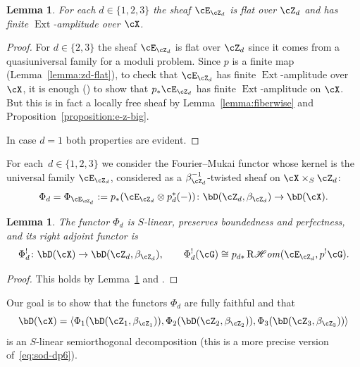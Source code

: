 \documentclass[11pt]{amsart}
\DeclareMathOperator{\Ext}{\mathrm{Ext}}
\DeclareMathOperator{\RCHom}{\mathrm{R}\mathscr{H}\mathit{om}}
\theoremstyle{plain}
\newtheorem{lemma}[theorem]{Lemma}
\theoremstyle{definition}
\theoremstyle{remark}
\begin{document}
\begin{lemma}
\label{lemma:ezd-tor-ext}
For each $d \in \{1,2,3\}$ the sheaf $\cE_{\cZ_d}$ is flat over $\cZ_d$ and has finite $\Ext$-amplitude over $\cX$.
\end{lemma}
\begin{proof}
For $d \in \{2,3\}$ the sheaf $\cE_{\cZ_d}$ is flat over $\cZ_d$ since it comes from a quasiuniversal family for a moduli problem.
Since $p$ is a finite map (Lemma~\ref{lemma:zd-flat}), to check that $\cE_{\cZ_d}$ has finite $\Ext$-amplitude over $\cX$, 
it is enough (\cite[Lemma~10.40]{kuznetsov2006hyperplane}) to show that $p_*\cE_{\cZ_d}$ has finite $\Ext$-amplitude on $\cX$.
But this is in fact a locally free sheaf by Lemma~\ref{lemma:fiberwise} and Proposition~\ref{proposition:e-z-big}.

In case $d = 1$ both properties are evident.
\end{proof}


For each~$d \in \{1,2,3\}$ we consider the Fourier--Mukai functor whose kernel is the universal family $\cE_{\cZ_d}$, considered as a $\beta_{\cZ_d}^{-1}$-twisted sheaf on $\cX  \times_S \cZ_d$:
\begin{equation}
\label{eq:phid-definition}
\Phi_d = \Phi_{\cE_{\cZ_d}} := p_*(\cE_{\cZ_d} \otimes p_d^*(-)) \colon \bD(\cZ_d,\beta_{\cZ_d}) \to \bD(\cX).
\end{equation}

\begin{lemma}
\label{lemma:phi-d-shriek}
The functor $\Phi_d$ is $S$-linear, preserves boundedness and perfectness, and its right adjoint functor is
\begin{equation}
\label{eq:phid-shriek}
\Phi_d^! \colon \bD(\cX) \to \bD(\cZ_d,\beta_{\cZ_d}),\qquad
\Phi_d^!(\cG) \cong p_{d*}\RCHom(\cE_{\cZ_d},p^!\cG).
\end{equation}
\end{lemma}
\begin{proof}
This holds by Lemma~\ref{lemma:ezd-tor-ext} and \cite[Lemma~2.4]{kuznetsov2006hyperplane}.
\end{proof}


Our goal is to show that the functors $\Phi_d$ are fully faithful and that 
\begin{equation}
\label{eq:dbcx-again}
\bD(\cX) = \langle \Phi_1(\bD(\cZ_1,\beta_{\cZ_1})), \Phi_2(\bD(\cZ_2,\beta_{\cZ_2})), \Phi_3(\bD(\cZ_3,\beta_{\cZ_3})) \rangle
\end{equation}
is an $S$-linear semiorthogonal decomposition (this is a more precise version of~\eqref{eq:sod-dp6}).
\end{document}
